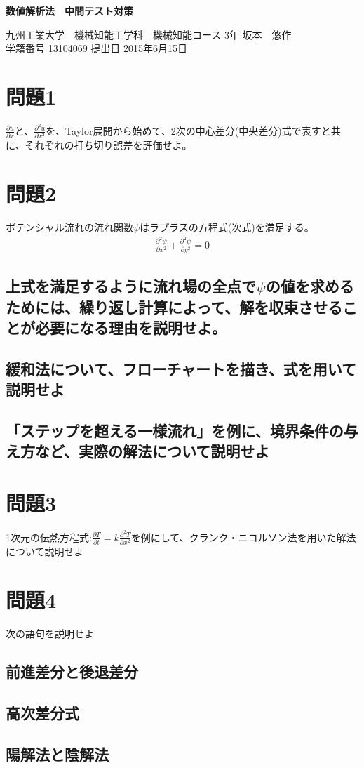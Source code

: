 \documentclass[a4j,twoside,openright,11pt]{jarticle}
\begin{document}
\begin{screen}
\huge
\begin{center}
{\bf 数値解析法　中間テスト対策}\\
\end{center}

\normalsize
\begin{flushright}
九州工業大学　機械知能工学科　機械知能コース 3年 坂本　悠作\\学籍番号 13104069 \hspace{0.2in}提出日 2015年6月15日
\end{flushright}
\end{screen}

\section{問題1}
$\frac{\partial u}{\partial x}$と、$\frac{\partial^2 u}{\partial x^2}$を、Taylor展開から始めて、2次の中心差分(中央差分)式で表すと共に、それぞれの打ち切り誤差を評価せよ。

\section{問題2}
ポテンシャル流れの流れ関数$\psi$はラプラスの方程式(次式)を満足する。
\begin{eqnarray}
\frac{\partial^2 \psi}{\partial x^2} + \frac{\partial^2 \psi}{\partial y^2} = 0
\end{eqnarray}

\subsection{上式を満足するように流れ場の全点で$\psi$の値を求めるためには、繰り返し計算によって、解を収束させることが必要になる理由を説明せよ。}
\subsection{緩和法について、フローチャートを描き、式を用いて説明せよ}
\subsection{「ステップを超える一様流れ」を例に、境界条件の与え方など、実際の解法について説明せよ}

\section{問題3}
1次元の伝熱方程式:$\frac{\partial T}{\partial t} = k \frac{\partial^2 T}{\partial x^2}$を例にして、クランク・ニコルソン法を用いた解法について説明せよ

\section{問題4}
次の語句を説明せよ
\subsection{前進差分と後退差分}

\subsection{高次差分式}
\subsection{陽解法と陰解法}
\end{document}
